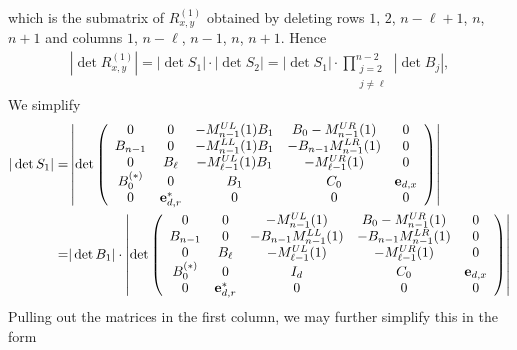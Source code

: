 \documentclass[11pt]{amsart}
\begin{document}
which is the submatrix of $R^{(1)}_{x,y}$ obtained by deleting rows $1$, $2$, $n-\ell+1$, $n$, $n+1$ and columns $1$, $n-\ell$, $n-1$, $n$, $n+1$.
Hence 
\begin{align}\label{eq:num1}
|\det R^{(1)}_{x,y}|=
|\det S_1|\cdot |\det S_2|= |\det S_1| \cdot \prod_{\substack{j=2\\ j\ne\ell}}^{n-2}|\det B_j|,
\end{align}
We simplify 
\begin{align}\notag
|\det S_1|=
&\left|\det\left(\begin{array}{ccccc}
0 &0 &-M_{n-1}^{UL}(1)B_1 &B_0-M_{n-1}^{UR}(1) &0\\
B_{n-1} &0 &-M_{n-1}^{LL}(1)B_1 &-B_{n-1}M_{n-1}^{LR}(1) &0\\
0 &B_\ell &-M_{\ell-1}^{UL}(1)B_1 &-M_{\ell-1}^{UR}(1) &0\\
B_0^{(*)} &0 &B_1 &C_0 &{\bf e}_{d,x}\\
0 &{\bf e}^*_{d,r} & 0 &0 &0
    \end{array}\right)\right| \notag\\
=
&|\det B_1|\cdot \left|\det\left(\begin{array}{ccccc}
0 &0 &-M_{n-1}^{UL}(1) &B_0-M_{n-1}^{UR}(1) &0\\
B_{n-1} &0 &-B_{n-1}M_{n-1}^{LL}(1) &-B_{n-1}M_{n-1}^{LR}(1) &0\\
0 &B_\ell &-M_{\ell-1}^{UL}(1) &-M_{\ell-1}^{UR}(1) &0\\
B_0^{(*)} &0 &I_d &C_0 &{\bf e}_{d,x}\\
0 &{\bf e}^*_{d,r} & 0 &0 &0
    \end{array}\right)\right|\notag 
        \end{align}
        Pulling out the matrices in the first column, we may further simplify this in the form 
\end{document}
